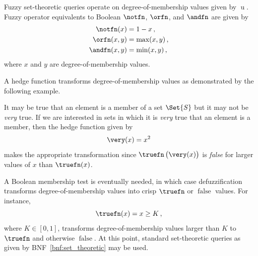 \documentclass[ ../main.tex]{subfiles}
\begin{document}
Fuzzy set-theoretic queries operate on degree-of-membership values given by $\operatorname{u}$. Fuzzy operator equivalents to Boolean $\notfn$, $\orfn$, and $\andfn$ are given by
\begin{align}
    \notfn(x) &= 1 - x\,,\\
    \orfn(x, y) &= \max(x, y)\,,\\
    \andfn(x, y) &= \min(x, y)\,,
\end{align}
where $x$ and $y$ are degree-of-membership values.

A hedge function transforms degree-of-membership values as demonstrated by the following example.
\begin{example}
It may be true that an element is a member of a set $\Set{S}$ but it may not be \emph{very} true. If we are interested in sets in which it is \emph{very} true that an element is a member, then the hedge function given by
\begin{equation}
    \very(x) = x^2
\end{equation}
makes the appropriate transformation since $\truefn\left(\very(x)\right)$ is \emph{false} for larger values of $x$ than $\truefn(x)$.
\end{example}

A Boolean membership test is eventually needed, in which case defuzzification transforms degree-of-membership values into crisp $\truefn$ or $\operatorname{false}$ values. For instance,
\begin{equation}
    \truefn(x) = x \geq K\,,
\end{equation}
where $K \in [0,1]$, transforms degree-of-membership values larger than $K$ to $\truefn$ and otherwise $\operatorname{false}$. At this point, standard set-theoretic queries as given by BNF~\ref{bnf:set_theoretic} may be used.
\end{document}
